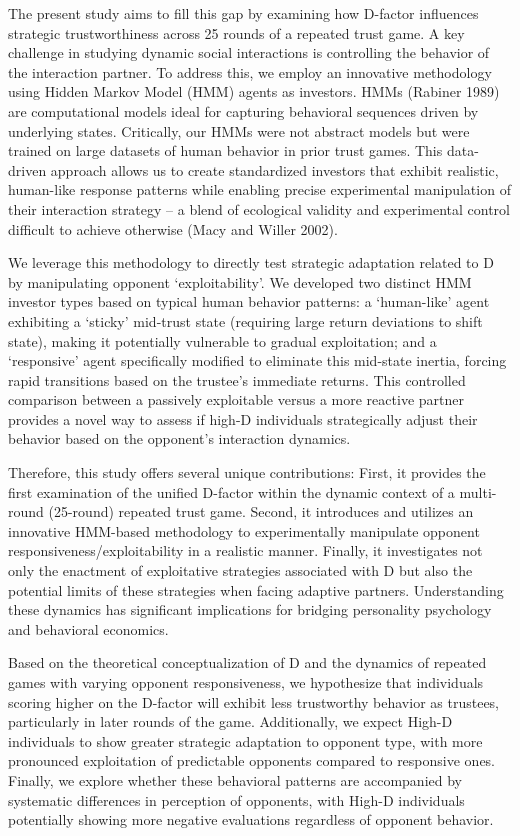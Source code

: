 \documentclass[
]{article}
\begin{document}
The present study aims to fill this gap by examining how D-factor influences strategic trustworthiness across 25 rounds of a repeated trust game. A key challenge in studying dynamic social interactions is controlling the behavior of the interaction partner. To address this, we employ an innovative methodology using Hidden Markov Model (HMM) agents as investors. HMMs (Rabiner 1989) are computational models ideal for capturing behavioral sequences driven by underlying states. Critically, our HMMs were not abstract models but were trained on large datasets of human behavior in prior trust games. This data-driven approach allows us to create standardized investors that exhibit realistic, human-like response patterns while enabling precise experimental manipulation of their interaction strategy -- a blend of ecological validity and experimental control difficult to achieve otherwise (Macy and Willer 2002).

We leverage this methodology to directly test strategic adaptation related to D by manipulating opponent `exploitability'. We developed two distinct HMM investor types based on typical human behavior patterns: a `human-like' agent exhibiting a `sticky' mid-trust state (requiring large return deviations to shift state), making it potentially vulnerable to gradual exploitation; and a `responsive' agent specifically modified to eliminate this mid-state inertia, forcing rapid transitions based on the trustee's immediate returns. This controlled comparison between a passively exploitable versus a more reactive partner provides a novel way to assess if high-D individuals strategically adjust their behavior based on the opponent's interaction dynamics.

Therefore, this study offers several unique contributions: First, it provides the first examination of the unified D-factor within the dynamic context of a multi-round (25-round) repeated trust game. Second, it introduces and utilizes an innovative HMM-based methodology to experimentally manipulate opponent responsiveness/exploitability in a realistic manner. Finally, it investigates not only the enactment of exploitative strategies associated with D but also the potential limits of these strategies when facing adaptive partners. Understanding these dynamics has significant implications for bridging personality psychology and behavioral economics.

Based on the theoretical conceptualization of D and the dynamics of repeated games with varying opponent responsiveness, we hypothesize that individuals scoring higher on the D-factor will exhibit less trustworthy behavior as trustees, particularly in later rounds of the game. Additionally, we expect High-D individuals to show greater strategic adaptation to opponent type, with more pronounced exploitation of predictable opponents compared to responsive ones. Finally, we explore whether these behavioral patterns are accompanied by systematic differences in perception of opponents, with High-D individuals potentially showing more negative evaluations regardless of opponent behavior.
\end{document}

